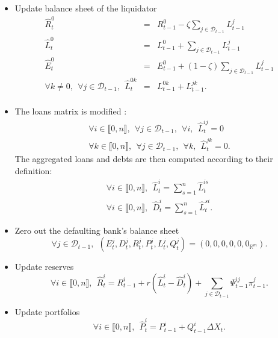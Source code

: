 \documentclass{article}
\newcommand{\wh}{\widehat}
\begin{document}
\begin{itemize}

    \item Update balance sheet of the liquidator  
    \begin{eqnarray*}
    \wh R_t^0 &=& R_{t-1}^0 - \zeta \sum_{j \in \mathcal{D}_{t-1}} L^j_{t-1}\\
    \wh L_t^0 &=& L_{t-1}^0 + \sum_{j \in \mathcal{D}_{t-1}} L^j_{t-1}\\
    \wh E_t^0 &=& E_{t-1}^0 + (1 -\zeta) \sum_{j \in \mathcal{D}_{t-1}} L^j_{t-1}\\
    \forall k \neq 0,~~\forall j \in \mathcal{D}_{t-1},~~ \wh L_t^{0k} &=& L_{t-1}^{0k} + L_{t-1}^{jk}.\\
    \end{eqnarray*}
    
    \item The loans matrix is modified :
    \begin{eqnarray*}
    \forall i \in \llbracket 0, n \rrbracket,~~\forall j \in \mathcal{D}_{t-1},~~\forall i,~~ \wh L_t^{ij} = 0 \\
    \forall k \in \llbracket 0, n \rrbracket,~~\forall j \in \mathcal{D}_{t-1},~~\forall k,~~ \wh L_t^{jk} = 0.
    \end{eqnarray*}
    The aggregated loans and debts are then computed according to their definition:
    \begin{eqnarray*}
    \forall i \in \llbracket 0, n \rrbracket,~~ \wh L_t^i = \sum_{s=1}^n \wh L_t^{is} \\
    \forall i \in \llbracket 0, n \rrbracket,~~ \wh D_t^i = \sum_{s=1}^n \wh L_t^{si}.
    \end{eqnarray*}
    
    \item Zero out the defaulting bank's balance sheet
    $$\forall j \in \mathcal{D}_{t-1},~~(E_t^j, D_t^j, R_t^j, P_t^j, L_t^j, Q_t^j) = (0, 0, 0, 0, 0, 0_{\mathbb{R}^m}).$$
    
    \item Update reserves
    $$ \forall i \in \llbracket 0, n \rrbracket,~~ \widehat{R}_t^i = R_{t-1}^i + r (\wh L_t^i - \wh D_t^i) + \sum_{j \in \mathcal{D}_{t-1}} \Psi_{t-1}^{ij} \pi_{t-1}^j.$$
    
    \item Update portfolios
    $$\forall i \in \llbracket 0, n \rrbracket,~~ \widehat{P}_t^i = P_{t-1}^i + Q_{t-1}^i\Delta X_t.$$
    

\end{itemize}
\end{document}

